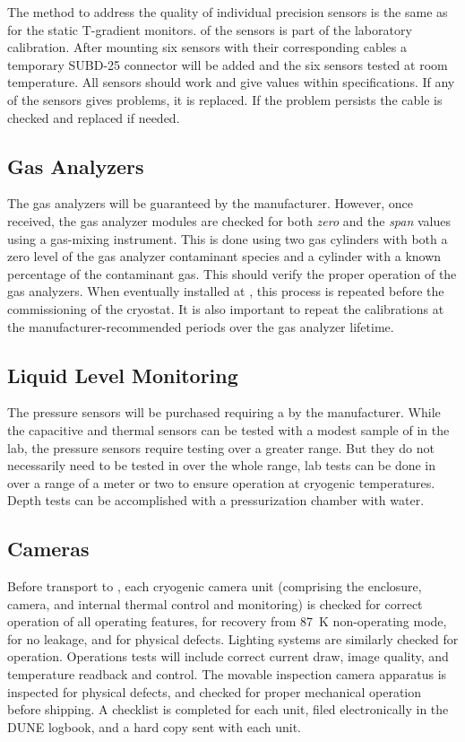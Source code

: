 The method to address the quality of individual precision sensors is the same as for the static T-gradient monitors.
 of the sensors is part of the laboratory calibration.  After mounting six sensors with their corresponding cables a
temporary SUBD-25 connector will be added and the six sensors tested at room temperature. All sensors should work and give values within specifications.  
If any of the sensors gives problems, it is replaced.  If the problem persists the cable is checked and replaced if needed.

\subsection{Gas Analyzers}
\label{sec:fdgen-slow-cryo-qc-ga}

The gas analyzers will be guaranteed by the manufacturer. However, once received, the gas analyzer modules are checked for both \textit{zero} and the \textit{span} values using a gas-mixing instrument. This is done using two gas cylinders with both a zero level of the gas analyzer contaminant species and a cylinder with a known percentage of the contaminant gas. This should verify the proper operation of the gas analyzers. When eventually installed at \surf, this process is repeated before the commissioning of the cryostat. It is also important to repeat the calibrations at the manufacturer-recommended periods over the gas analyzer lifetime.


\subsection{Liquid Level Monitoring}
\label{sec:fdgen-slow-cryo-qc-llm}

The pressure sensors will be purchased requiring a  by the manufacturer.
While the capacitive and thermal sensors can be tested with a modest sample of \lar in the lab,
the pressure sensors require testing over a greater range.  But they do not
necessarily need to be tested in \lar over the whole range,  lab tests
can be done in \lar over a range of a meter or two to ensure operation
at cryogenic temperatures.  Depth tests can be accomplished with a
pressurization chamber with water.

\subsection{Cameras}
\label{sec:fdgen-slow-cryo-qc-c}

Before transport to \surf, each cryogenic camera unit (comprising the enclosure, camera, and internal thermal control and monitoring) is checked for correct operation of all operating features, for recovery from \SI{87}{K} non-operating mode, for no leakage, and for physical defects. Lighting systems are similarly checked for operation. Operations tests will include correct current draw, image quality, and temperature readback and control. The movable inspection camera apparatus is inspected for physical defects, and checked for proper mechanical operation before shipping. A checklist is completed for each unit, filed electronically in the DUNE logbook, and a hard copy sent with each unit. 

